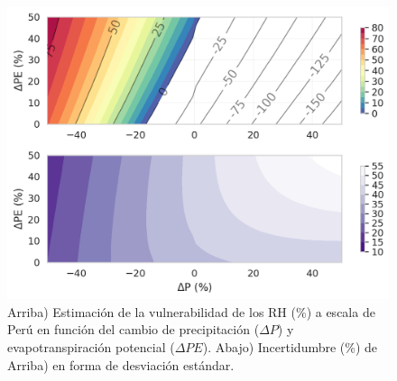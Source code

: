 \begin{figure}[ht!]
	\includegraphics[scale=.95]{Images/12_VI_PERU_scale.png}
	\centering
	\caption{Arriba) Estimación de la vulnerabilidad de los RH (\%) a escala de Perú en función del cambio de precipitación ($\Delta P$) y evapotranspiración potencial ($\Delta PE$). Abajo) Incertidumbre (\%) de Arriba) en forma de desviación estándar.}
	\label{fig:12_VI_PERU_scale}
\end{figure}
